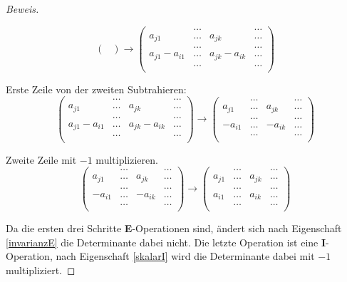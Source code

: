 \begin{proof}[Beweis]
\begin{compactenum}
\[\begin{pmatrix}
\end{pmatrix}
\rightarrow
\begin{pmatrix}
             &\dots&             &\dots\\
a_{j1}       &\dots&a_{jk}       &\dots\\
             &\dots&             &\dots\\
a_{j1}-a_{i1}&\dots&a_{jk}-a_{ik}&\dots\\
             &\dots&             &\dots\\
\end{pmatrix}
\]
\item  Erste Zeile von der zweiten Subtrahieren:
\[
\begin{pmatrix}
             &\dots&             &\dots\\
a_{j1}       &\dots&a_{jk}       &\dots\\
             &\dots&             &\dots\\
a_{j1}-a_{i1}&\dots&a_{jk}-a_{ik}&\dots\\
             &\dots&             &\dots\\
\end{pmatrix}
\rightarrow
\begin{pmatrix}
       &\dots&       &\dots\\
a_{j1} &\dots&a_{jk} &\dots\\
       &\dots&       &\dots\\
-a_{i1}&\dots&-a_{ik}&\dots\\
       &\dots&       &\dots\\
\end{pmatrix}
\]
\item Zweite Zeile mit $-1$ multiplizieren.
\[
\begin{pmatrix}
       &\dots&       &\dots\\
a_{j1} &\dots&a_{jk} &\dots\\
       &\dots&       &\dots\\
-a_{i1}&\dots&-a_{ik}&\dots\\
       &\dots&       &\dots\\
\end{pmatrix}
\rightarrow
\begin{pmatrix}
      &\dots&      &\dots\\
a_{j1}&\dots&a_{jk} &\dots\\
      &\dots&      &\dots\\
a_{i1}&\dots&a_{ik}&\dots\\
      &\dots&      &\dots\\
\end{pmatrix}
\]
\end{compactenum}
Da die ersten drei Schritte {\bf E}-Operationen sind, ändert sich nach
Eigenschaft \ref{invarianzE} die Determinante dabei nicht.
Die letzte
Operation ist eine {\bf I}-Operation, nach Eigenschaft \ref{skalarI}
wird die Determinante dabei mit $-1$ multipliziert.
\end{proof}

